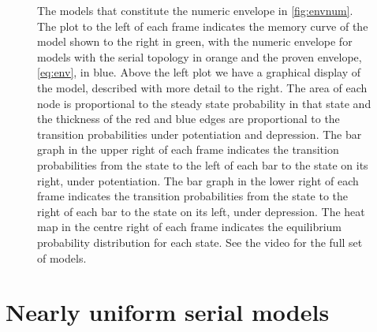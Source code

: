 \documentclass[12pt]{article}
\newenvironment{myenuma}{\begin{inparaenum}[(a)]}{\end{inparaenum}}
\begin{document}
\begin{figure}[tbp]
\begin{myenuma}
  \end{myenuma}
  \caption[Optimal models]{The models that constitute the numeric envelope in \autoref{fig:envnum}.
  The plot to the left of each frame indicates the memory curve of the model shown to the right in green, with the numeric envelope for models with the serial topology in orange and the proven envelope, \eqref{eq:env}, in blue.
  Above the left plot we have a graphical display of the model, described with more detail to the right.
  The area of each node is proportional to the steady state probability in that state and the thickness of the red and blue edges are proportional to the transition probabilities under potentiation and depression.
  The bar graph in the upper right of each frame indicates the transition probabilities from the state to the left of each bar to the state on its right, under potentiation.
  The bar graph in the lower right of each frame indicates the transition probabilities from the state to the right of each bar to the state on its left, under depression.
  The heat map in the centre right of each frame indicates the equilibrium probability distribution for each state.
  See the video for the full set of models.}\label{fig:envvid}
\end{figure}


\section{Nearly uniform serial models}\label{sec:serial}
\end{document}
